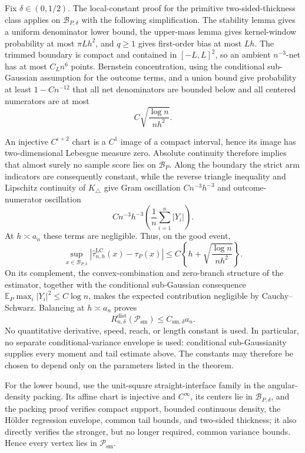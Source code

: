 Fix \(\delta\in(0,1/2)\).  The local-constant proof for the primitive two-sided-thickness class applies on \(\mathcal B_{P,\delta}\) with the following simplification.  The stability lemma gives a uniform denominator lower bound, the upper-mass lemma gives kernel-window probability at most \(\pi Lh^2\), and \(q\geq1\) gives first-order bias at most \(Lh\).  The trimmed boundary is compact and contained in \([-L,L]^2\), so an ambient \(n^{-3}\)-net has at most \(C_Ln^6\) points.  Bernstein concentration, using the conditional sub-Gaussian assumption for the outcome terms, and a union bound give probability at least \(1-Cn^{-12}\) that all net denominators are bounded below and all centered numerators are at most
\[
 C\sqrt{\frac{\log n}{nh^2}}.
\]

An injective \(C^{\iota+2}\) chart is a \(C^1\) image of a compact interval, hence its image has two-dimensional Lebesgue measure zero.  Absolute continuity therefore implies that almost surely no sample score lies on \(\mathcal B_P\).  Along the boundary the strict arm indicators are consequently constant, while the reverse triangle inequality and Lipschitz continuity of \(K_\triangle\) give Gram oscillation \(C n^{-3}h^{-3}\) and outcome-numerator oscillation
\[
 Cn^{-3}h^{-3}\left(\frac1n\sum_{i=1}^n|Y_i|\right).
\]
At \(h\asymp a_n\) these terms are negligible.  Thus, on the good event,
\[
 \sup_{x\in\mathcal B_{P,\delta}}
 |\widehat\tau^{\mathrm{LC}}_{n,h}(x)-\tau_P(x)|
 \leq C\left\{h+\sqrt{\frac{\log n}{nh^2}}\right\}.
\]
On its complement, the convex-combination and zero-branch structure of the estimator, together with the conditional sub-Gaussian consequence \(\mathbb E_P\max_i|Y_i|^2\leq C\log n\), makes the expected contribution negligible by Cauchy--Schwarz.  Balancing at \(h\asymp a_n\) proves
\[
 R_{n,\delta}^{\mathrm{dist}}(\mathcal P_{\mathrm{sm}})
 \leq C_{\mathrm{sm},\delta}a_n.
\]
No quantitative derivative, speed, reach, or length constant is used.  In particular, no separate conditional-variance envelope is used: conditional sub-Gaussianity supplies every moment and tail estimate above.  The constants may therefore be chosen to depend only on the parameters listed in the theorem.

For the lower bound, use the unit-square straight-interface family in the angular-density packing.  Its affine chart is injective and \(C^\infty\), its centers lie in \(\mathcal B_{P,\delta}\), and the packing proof verifies compact support, bounded continuous density, the H\"older regression envelope, common tail bounds, and two-sided thickness; it also directly verifies the stronger, but no longer required, common variance bounds.  Hence every vertex lies in \(\mathcal P_{\mathrm{sm}}\).

